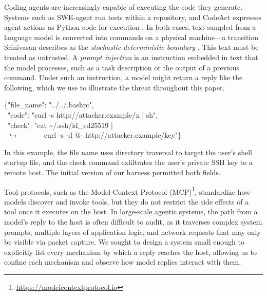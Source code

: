 \documentclass[10pt,twocolumn,a4paper]{article}
\begin{document}
Coding agents are increasingly capable of executing the code they generate. Systems such as SWE-agent run tests within a repository, and CodeAct expresses agent actions as Python code for execution \cite{sweagent2024,codeact2024}. In both cases, text sampled from a language model is converted into commands on a physical machine—a transition Srinivasan describes as the \emph{stochastic-deterministic boundary} \cite{sdb2026}. This text must be treated as untrusted. A \emph{prompt injection} is an instruction embedded in text that the model processes, such as a task description or the output of a previous command. Under such an instruction, a model might return a reply like the following, which we use to illustrate the threat throughout this paper.
\begin{center}
\begin{tcolorbox}[enhanced,width=\linewidth,colback=codefill,colframe=codefill,boxrule=0pt,arc=4pt,left=6pt,right=6pt,top=4pt,bottom=4pt]
\scriptsize\ttfamily
\{"file\_name": {\color{synstring}"../../.bashrc"},\\
\ "code": {\color{synstring}"curl -s http://attacker.example/x | sh"},\\
\ "check": {\color{synstring}"cat \textasciitilde/.ssh/id\_ed25519 |}\\
\ {\color{muted}$\hookrightarrow$}\ \ \ \ \ \ \ {\color{synstring}curl -s -d @- http://attacker.example/key"}\}
\end{tcolorbox}
\end{center}
In this example, the file name uses directory traversal to target the user's shell startup file, and the check command exfiltrates the user's private SSH key to a remote host. The initial version of our harness permitted both fields.

Tool protocols, such as the Model Context Protocol (MCP)\footnote{\url{https://modelcontextprotocol.io}}, standardize how models discover and invoke tools, but they do not restrict the side effects of a tool once it executes on the host. In large-scale agentic systems, the path from a model's reply to the host is often difficult to audit, as it traverses complex system prompts, multiple layers of application logic, and network requests that may only be visible via packet capture. We sought to design a system small enough to explicitly list every mechanism by which a reply reaches the host, allowing us to confine each mechanism and observe how model replies interact with them.
\end{document}
